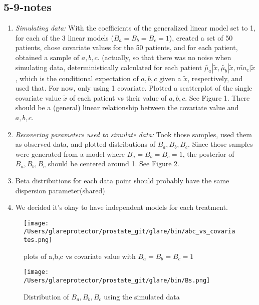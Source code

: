 \documentclass[a4paper,10pt]{article}
\begin{document}
\subsection*{5-9-notes}
\begin{enumerate}
\item \emph{Simulating data:}  With the coefficients of the generalized linear model set to 1, for each of the 3 linear models ($B_a=B_b=B_c=1$), created a set of 50 patients, chose covariate values for the 50 patients, and for each patient, obtained a sample of $a, b, c$.  (actually, so that there was no noise when simulating data, deterministically calculated for each patient $\tilde{\mu_a}|\tilde{x}, \tilde{\mu_b}|\tilde{x}, \tilde{mu_c}|\tilde{x}$, which is the conditional expectation of $a, b, c$ given a $\tilde{x}$, respectively, and used that.  For now, only using 1 covariate.  Plotted a scatterplot of the single covariate value $\tilde{x}$ of each patient vs their value of $a, b, c$.  See Figure 1.  There should be a (general) linear relationship between the covariate value and $a, b, c$.

\item \emph{Recovering parameters used to simulate data: }  Took those samples, used them as observed data, and plotted distributions of $B_a, B_b, B_c$.  Since those samples were generated from a model where  $B_a=B_b=B_c=1$, the posterior of  $B_a, B_b, B_c$ should be centered around 1.  See Figure 2.

\item Beta distributions for each data point should probably have the same dispersion parameter(shared)

\item We decided it's okay to have independent models for each treatment.

\end{enumerate}

\begin{figure}
\begin{center}
\texttt{[image: /Users/glareprotector/prostate\_git/glare/bin/abc\_vs\_covariates.png]}
\caption{plots of a,b,c vs covariate value with $B_a=B_b=B_c=1$}
\end{center}
\end{figure}

\begin{figure}
\begin{center}
\texttt{[image: /Users/glareprotector/prostate\_git/glare/bin/Bs.png]}
\caption{Distribution of $B_a, B_b, B_c$ using the simulated data}
\end{center}
\end{figure}
\end{document}
